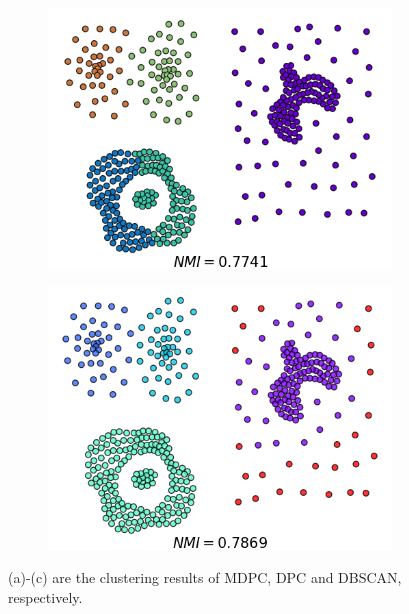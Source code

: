 \documentclass{llncs}
\begin{document}
\begin{figure}[ht]
\begin{subfigure}[t]{0.23\textwidth}
\includegraphics[width=1\textwidth]{image/Compound_org.png}
\end{subfigure}
\begin{subfigure}[t]{0.23\textwidth}
\centering
\includegraphics[width=1\textwidth]{image/Compound_dbscan.png}
\end{subfigure}
\caption{(a)-(c) are the clustering results of MDPC, DPC and DBSCAN, respectively.}
\label{fig:three}
\end{figure}
\end{document}
